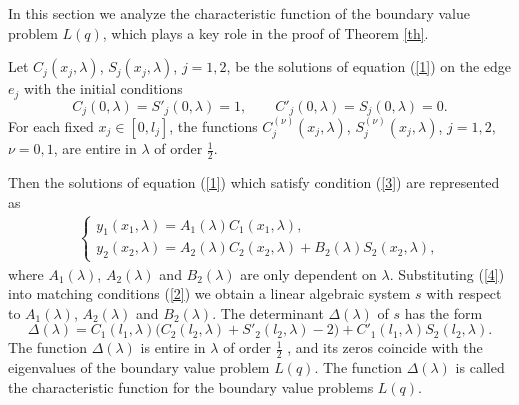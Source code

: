 \documentclass[reqno,11pt,centertags]{amsart}
\numberwithin{equation}{section}
\theoremstyle{definition}
\begin{document}
	In this section we analyze the characteristic function of the  boundary value problem $L(q)$, which plays a key role in the proof of Theorem \ref{th}.

Let $C_{j}(x_{j},\lambda)$, $S_{j}(x_{j},\lambda)$, $j=1,2$, be the solutions of equation (\ref{1}) on the edge $e_{j}$ with the initial conditions
\begin{equation}
  C_{j}(0,\lambda)=S'_{j}(0,\lambda)=1,\qquad C'_{j}(0,\lambda)=S_{j}(0,\lambda)=0.  \nonumber
\end{equation}
For each fixed $x_{j}\in[0,l_{j}]$, the functions $C_{j}^{(\nu)}(x_{j},\lambda)$, $S_{j}^{(\nu)}(x_{j},\lambda)$, $j=1,2$, $\nu=0,1$, are entire in $\lambda$ of order $\frac{1}{2}$.

Then the solutions of equation (\ref{1}) which satisfy condition (\ref{3}) are represented as
\begin{align}\label{4}
       \begin{cases}
          y_{1}(x_{1},\lambda)=A_{1}(\lambda)C_{1}(x_{1},\lambda),  \\
           y_{2}(x_{2},\lambda)=A_{2}(\lambda)C_{2}(x_{2},\lambda)+B_{2}(\lambda)S_{2}(x_{2},\lambda),
        \end{cases}
\end{align}
where $A_{1}(\lambda)$, $A_{2}(\lambda)$ and $B_{2}(\lambda)$ are only dependent on $\lambda$. Substituting (\ref{4}) into matching conditions (\ref{2})  we obtain a linear algebraic system $s$ with respect to $A_{1}(\lambda)$, $A_{2}(\lambda)$ and $B_{2}(\lambda)$. The determinant $\Delta(\lambda)$ of $s$ has the form
\begin{equation}\label{5}
  \Delta(\lambda)=C_{1}(l_{1},\lambda)\Big(C_{2}(l_{2},\lambda)+S'_{2}(l_{2},\lambda)-2\Big)+C'_{1}(l_{1},\lambda)S_{2}(l_{2},\lambda).
\end{equation}
The function $\Delta(\lambda)$ is entire in $\lambda$ of order $\frac{1}{2}$ , and its zeros coincide with the eigenvalues of the boundary value problem $L(q)$. The function $\Delta(\lambda)$ is called the characteristic function for the boundary value problems $L(q)$.
\end{document}
